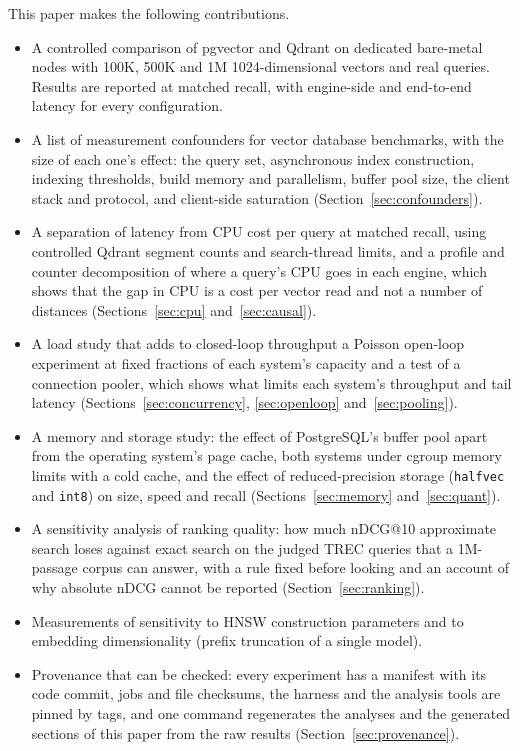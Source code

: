 \documentclass[preprint,12pt]{elsarticle}
\begin{document}
This paper makes the following contributions.
\begin{itemize}
  \item A controlled comparison of pgvector and Qdrant on dedicated bare-metal nodes
    with 100K, 500K and 1M 1024-dimensional vectors and real queries. Results are
    reported at matched recall, with engine-side and end-to-end latency for every
    configuration.
  \item A list of measurement confounders for vector database benchmarks, with the
    size of each one's effect: the query set, asynchronous index construction,
    indexing thresholds, build memory and parallelism, buffer pool size, the client
    stack and protocol, and client-side saturation (Section~\ref{sec:confounders}).
  \item A separation of latency from CPU cost per query at matched recall, using
    controlled Qdrant segment counts and search-thread limits, and a profile and counter
    decomposition of where a query's CPU goes in each engine, which shows that the gap in
    CPU is a cost per vector read and not a number of distances
    (Sections~\ref{sec:cpu} and~\ref{sec:causal}).
  \item A load study that adds to closed-loop throughput a Poisson open-loop experiment at
    fixed fractions of each system's capacity and a test of a connection pooler, which shows
    what limits each system's throughput and tail latency
    (Sections~\ref{sec:concurrency}, \ref{sec:openloop} and~\ref{sec:pooling}).
  \item A memory and storage study: the effect of PostgreSQL's buffer pool apart from the operating
    system's page cache, both systems under cgroup memory limits with a cold cache, and the
    effect of reduced-precision storage (\texttt{halfvec} and \texttt{int8}) on size, speed and recall
    (Sections~\ref{sec:memory} and~\ref{sec:quant}).
  \item A sensitivity analysis of ranking quality: how much nDCG@10 approximate search loses against
    exact search on the judged TREC queries that a 1M-passage corpus can answer, with a rule fixed before
    looking and an account of why absolute nDCG cannot be reported (Section~\ref{sec:ranking}).
  \item Measurements of sensitivity to HNSW construction parameters and to embedding
    dimensionality (prefix truncation of a single model).
  \item Provenance that can be checked: every experiment has a manifest with its code commit, jobs and
    file checksums, the harness and the analysis tools are pinned by tags, and one command regenerates
    the analyses and the generated sections of this paper from the raw results (Section~\ref{sec:provenance}).
\end{itemize}
\end{document}
